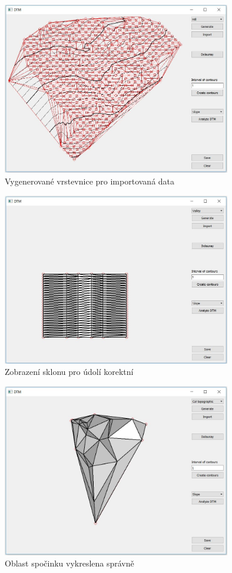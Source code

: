 \documentclass[a4paper, 12pt]{article}
\begin{document}
\begin{figure}[h!]
\centering
\includegraphics[width=10cm]{pictures/imported.jpg}
\caption{Vygenerované vrstevnice pro importovaná data}
\end{figure}

\begin{figure}[h!]
\centering
\includegraphics[width=10cm]{pictures/valley_sklon.jpg}
\caption{Zobrazení sklonu pro údolí korektní}
\end{figure}

\begin{figure}[h!]
\centering
\includegraphics[width=10cm]{pictures/spocinek_sklon.jpg}
\caption{Oblast spočinku vykreslena správně}
\end{figure}
\end{document}
